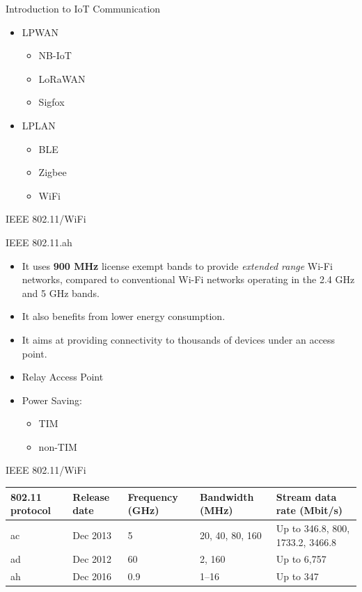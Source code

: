\documentclass[serif,Blue]{beamer}
\begin{document}
\begin{frame}{Introduction to IoT Communication}
	\begin{itemize}
		\item LPWAN
			\begin{itemize}
				\item NB-IoT
				\item LoRaWAN
				\item Sigfox
			\end{itemize}
		\item LPLAN
			\begin{itemize}
				\item BLE
				\item Zigbee
				\item WiFi
			\end{itemize}
	\end{itemize}
\end{frame}

\begin{frame}{IEEE 802.11/WiFi}
	\begin{block}{IEEE 802.11.ah}
		\begin{itemize}
			\item It uses \textbf{900 MHz} license exempt bands to provide \emph{extended range} Wi-Fi networks, compared to conventional Wi-Fi networks operating in the 2.4 GHz and 5 GHz bands.
			\item It also benefits from lower energy consumption.
			\item It aims at providing connectivity to thousands of devices under an access point.
			\item Relay Access Point
			\item Power Saving:
			\begin{itemize}
				\item TIM
				\item non-TIM
			\end{itemize}
		\end{itemize}
	\end{block}
\end{frame}

\begin{frame}{IEEE 802.11/WiFi}
	\begin{tabular}{p{1cm} p{1cm} p{1.5cm} p{1.5cm} p{3.5cm}}
		\toprule
		802.11 protocol & Release date & Frequency (GHz) & Bandwidth (MHz) & Stream data rate (Mbit/s) \\
		\midrule
		ac & Dec 2013 & 5 & 20, 40, 80, 160 & Up to 346.8, 800, 1733.2, 3466.8\\
		ad & Dec 2012 & 60 & 2, 160 & Up to 6,757\\
		ah & Dec 2016 & 0.9 & 1--16 & Up to 347\\
		\bottomrule
	\end{tabular}
\end{frame}
\end{document}
